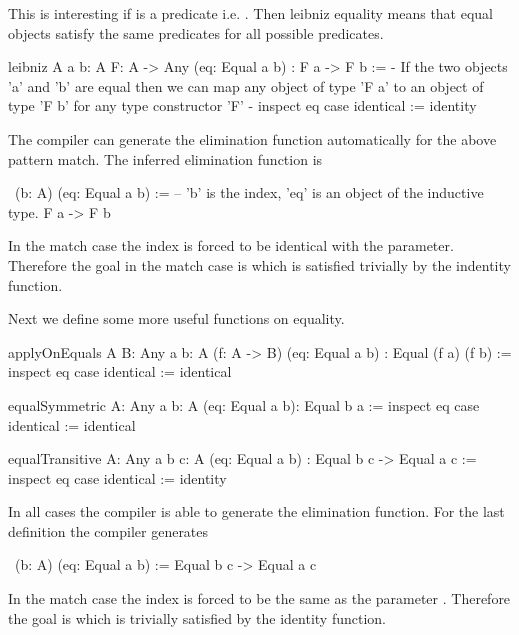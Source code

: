 This is interesting if  is a predicate i.e. .
Then leibniz equality means that equal objects satisfy the same predicates for
all possible predicates.

\begin{alba}
    leibniz
        {A} {a b: A}
        {F: A -> Any}
        (eq: Equal a b)
        : F a -> F b
    :=
        {- If the two objects 'a' and 'b' are equal then we can map any
           object of type 'F a' to an object of type 'F b' for any type
           constructor 'F'  -}
        inspect eq case
            identical := identity
\end{alba}

The compiler can generate the elimination function automatically for the above
pattern match. The inferred elimination function is
%
\begin{alba}
    \ (b: A) (eq: Equal a b) :=
            -- 'b' is the index, 'eq' is an object of the inductive type.
        F a -> F b
\end{alba}
%
In the match case  the index is forced to be identical with the
parameter. Therefore the goal in the match case is  which is
satisfied trivially by the indentity function.




Next we define some more useful functions on equality.
%
\begin{alba}
    applyOnEquals
        {A B: Any} {a b: A}
        (f: A -> B) (eq: Equal a b)
        : Equal (f a) (f b)
    :=
        inspect eq case
            identical := identical

    equalSymmetric
        {A: Any} {a b: A}
        (eq: Equal a b): Equal b a
    :=
        inspect eq case
            identical := identical

    equalTransitive
        {A: Any} {a b c: A}
        (eq: Equal a b)
        : Equal b c -> Equal a c
    :=
        inspect eq case
            identical := identity
\end{alba}


In all cases the compiler is able to generate the elimination function. For the
last definition the compiler generates
%
\begin{alba}
    \ (b: A) (eq: Equal a b) :=
        Equal b c -> Equal a c
\end{alba}
%
In the match case the index  is forced to be the same as the parameter
. Therefore the goal is  which is trivially
satisfied by the identity function.






